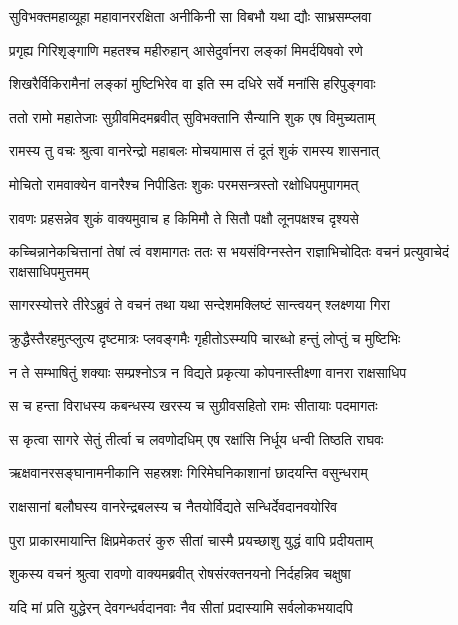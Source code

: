 \twolineshloka
{सुविभक्तमहाव्यूहा महावानररक्षिता}
{अनीकिनी सा विबभौ यथा द्यौः साभ्रसम्प्लवा} %

\twolineshloka
{प्रगृह्य गिरिशृङ्गाणि महतश्च महीरुहान्}
{आसेदुर्वानरा लङ्कां मिमर्दयिषवो रणे} %

\twolineshloka
{शिखरैर्विकिरामैनां लङ्कां मुष्टिभिरेव वा}
{इति स्म दधिरे सर्वे मनांसि हरिपुङ्गवाः} %

\twolineshloka
{ततो रामो महातेजाः सुग्रीवमिदमब्रवीत्}
{सुविभक्तानि सैन्यानि शुक एष विमुच्यताम्} %

\twolineshloka
{रामस्य तु वचः श्रुत्वा वानरेन्द्रो महाबलः}
{मोचयामास तं दूतं शुकं रामस्य शासनात्} %

\twolineshloka
{मोचितो रामवाक्येन वानरैश्च निपीडितः}
{शुकः परमसन्त्रस्तो रक्षोधिपमुपागमत्} %

\twolineshloka
{रावणः प्रहसन्नेव शुकं वाक्यमुवाच ह}
{किमिमौ ते सितौ पक्षौ लूनपक्षश्च दृश्यसे} %

\threelineshloka
{कच्चिन्नानेकचित्तानां तेषां त्वं वशमागतः}
{ततः स भयसंविग्नस्तेन राज्ञाभिचोदितः}
{वचनं प्रत्युवाचेदं राक्षसाधिपमुत्तमम्} %

\twolineshloka
{सागरस्योत्तरे तीरेऽब्रुवं ते वचनं तथा}
{यथा सन्देशमक्लिष्टं सान्त्वयन् श्लक्ष्णया गिरा} %

\twolineshloka
{क्रुद्धैस्तैरहमुत्प्लुत्य दृष्टमात्रः प्लवङ्गमैः}
{गृहीतोऽस्म्यपि चारब्धो हन्तुं लोप्तुं च मुष्टिभिः} %

\twolineshloka
{न ते सम्भाषितुं शक्याः सम्प्रश्नोऽत्र न विद्यते}
{प्रकृत्या कोपनास्तीक्ष्णा वानरा राक्षसाधिप} %

\twolineshloka
{स च हन्ता विराधस्य कबन्धस्य खरस्य च}
{सुग्रीवसहितो रामः सीतायाः पदमागतः} %

\twolineshloka
{स कृत्वा सागरे सेतुं तीर्त्वा च लवणोदधिम्}
{एष रक्षांसि निर्धूय धन्वी तिष्ठति राघवः} %

\twolineshloka
{ऋक्षवानरसङ्घानामनीकानि सहस्रशः}
{गिरिमेघनिकाशानां छादयन्ति वसुन्धराम्} %

\twolineshloka
{राक्षसानां बलौघस्य वानरेन्द्रबलस्य च}
{नैतयोर्विद्यते सन्धिर्देवदानवयोरिव} %

\twolineshloka
{पुरा प्राकारमायान्ति क्षिप्रमेकतरं कुरु}
{सीतां चास्मै प्रयच्छाशु युद्धं वापि प्रदीयताम्} %

\twolineshloka
{शुकस्य वचनं श्रुत्वा रावणो वाक्यमब्रवीत्}
{रोषसंरक्तनयनो निर्दहन्निव चक्षुषा} %

\twolineshloka
{यदि मां प्रति युद्धेरन् देवगन्धर्वदानवाः}
{नैव सीतां प्रदास्यामि सर्वलोकभयादपि} %

